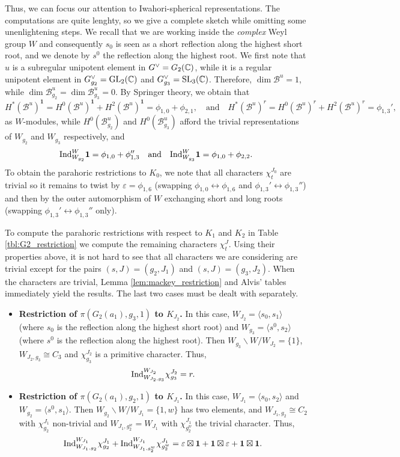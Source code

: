Thus, we can focus our attention to Iwahori-spherical representations. The computations are quite lenghty, so we give a complete sketch while omitting some unenlightening steps. We recall that we are working inside the \textit{complex} Weyl group $W$ and consequently $s_0$ is seen as a short reflection along the highest short root, and we denote by $s^0$ the reflection along the highest root. We first note that $u$ is a subregular unipotent element in $G^\vee=G_2(\mathbb{C})$, while it is a regular unipotent element in $G^\vee_{g_2}=\mathrm{GL}_2(\mathbb{C})$ and $G^\vee_{g_3}=\mathrm{SL}_3(\mathbb{C})$. Therefore, $\dim\mathcal{B}^u=1$, while $\dim\mathcal{B}_{g_2}^u=\dim\mathcal{B}_{g_3}^u=0$. By Springer theory, we obtain that 
$$H^*(\mathcal{B}^u)^\mathbf{1}=H^0(\mathcal{B}^u)^\mathbf{1}+H^2(\mathcal{B}^u)^\mathbf{1}=\phi_{1,0}+\phi_{2,1},\quad\text{and}\quad H^*(\mathcal{B}^u)^r=H^0(\mathcal{B}^u)^r+H^2(\mathcal{B}^u)^r=\phi_{1,3}',$$
as $W$-modules, while $H^0(\mathcal{B}_{g_2}^u)$ and $H^0(\mathcal{B}_{g_3}^u)$ afford the trivial representations of $W_{g_2}$ and $W_{g_3}$ respectively, and
$$\mathrm{Ind}_{W_{g_2}}^W\mathbf{1}=\phi_{1,0}+\phi_{1,3}''\quad\text{and}\quad\mathrm{Ind}_{W_{g_3}}^W\mathbf{1}=\phi_{1,0}+\phi_{2,2}.$$
To obtain the parahoric restrictions to $K_0$, we note that all characters $\chi_t^{J_0}$ are trivial so it remains to twist by $\varepsilon=\phi_{1,6}$ (swapping $\phi_{1,0}\leftrightarrow\phi_{1,6}$ and $\phi_{1,3}'\leftrightarrow\phi_{1,3}''$) and then by the outer automorphism of $W$ exchanging short and long roots (swapping $\phi_{1,3}'\leftrightarrow\phi_{1,3}''$ only). 

To compute the parahoric restrictions with respect to $K_1$ and $K_2$ in Table \ref{tbl:G2_restriction} we compute the remaining characters $\chi_t^J$. Using their properties above, it is not hard to see that all characters we are considering are trivial except for the pairs $(s,J)=(g_2,J_1)$ and $(s,J)=(g_3,J_2)$. When the characters are trivial, Lemma \ref{lem:mackey_restriction} and Alvis' tables immediately yield the results. The last two cases must be dealt with separately.
\begin{itemize}
    \item \textbf{Restriction of $\pi(G_2(a_1),g_3,1)$ to $K_{J_2}$.} In this case, $W_{J_2}=\langle s_0,s_1\rangle$ (where $s_0$ is the reflection along the highest short root) and $W_{g_3}=\langle s^0,s_2\rangle$ (where $s^0$ is the reflection along the highest root). Then $W_{g_3}\backslash W/W_{J_2}=\{1\}$, $W_{J_2,g_3}\cong C_3$ and $\chi_{g_3}^{J_2}$ is a primitive character. Thus, 
    $$\mathrm{Ind}_{W_{J_2,g_3}}^{W_{J_2}}\chi_{g_3}^{J_2}=r.$$ 
    \item \textbf{Restriction of $\pi(G_2(a_1),g_2,1)$ to $K_{J_1}$.} In this case, $W_{J_1}=\langle s_0,s_2\rangle$ and $W_{g_2}=\langle s^0,s_1\rangle$. Then $W_{g_2}\backslash W/W_{J_1}=\{1,w\}$ has two elements, and $W_{J_1,g_2}\cong C_2$ with $\chi_{g_2}^{J_1}$ non-trivial and $W_{J_1,g_2^w}=W_{J_1}$ with $\chi_{g_2^w}^{J_1}$ the trivial character. Thus,
    $$\mathrm{Ind}_{W_{J_1,g_2}}^{W_{J_1}}\chi_{g_2}^{J_1}+\mathrm{Ind}_{W_{J_1,g_2^w}}^{W_{J_1}}\chi_{g_2^w}^{J_1}=\varepsilon\boxtimes\mathbf{1}+\mathbf{1}\boxtimes\varepsilon+\mathbf{1}\boxtimes\mathbf{1}.$$ 
\end{itemize}

